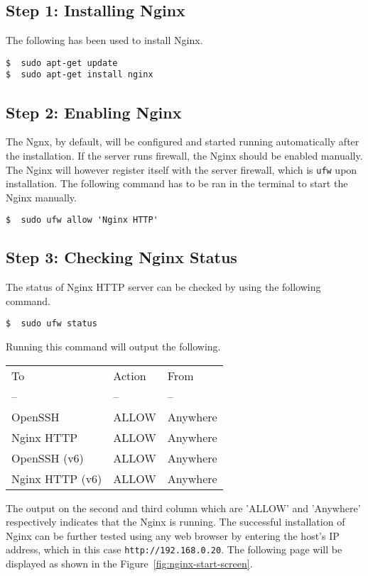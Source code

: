 \subsection{Step 1: Installing Nginx}
The following has been used to install Nginx.
\begin{lstlisting}
$  sudo apt-get update
$  sudo apt-get install nginx
\end{lstlisting}

\subsection{Step 2: Enabling Nginx}
The Ngnx, by default, will be configured and started running automatically after the installation. If the server runs firewall, the Nginx should be enabled manually. The Nginx will however register itself with the server firewall, which is \texttt{ufw} upon installation. The following command has to be ran in the terminal to start the Nginx manually.

\begin{lstlisting}
$  sudo ufw allow 'Nginx HTTP'
\end{lstlisting}

\subsection{Step 3: Checking Nginx Status}
The status of Nginx HTTP server can be checked by using the following command.

\begin{lstlisting}
$  sudo ufw status
\end{lstlisting}

Running this command will output the following.
\begin{table}[ht]
\begin{tabular}{l l l}
To & Action & From \\
-- & -- & -- \\
OpenSSH & ALLOW & Anywhere \\
Nginx HTTP & ALLOW & Anywhere \\
OpenSSH  (v6) & ALLOW & Anywhere \\
Nginx HTTP (v6) & ALLOW & Anywhere \\
\end{tabular}
\end{table}

The output on the second and third column which are 'ALLOW' and 'Anywhere' respectively indicates that the Nginx is running. The successful installation of Nginx can be further tested using any web browser by entering the host's IP address, which in this case \texttt{http://192.168.0.20}. The following page will be displayed as shown in the Figure~\ref{fig:nginx-start-screen}.

